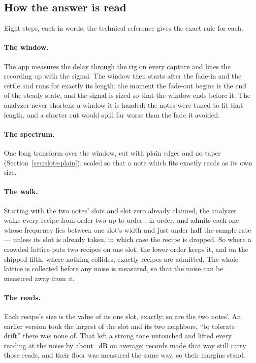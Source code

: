 \documentclass[11pt,a4paper]{article}
\begin{document}
\subsection{How the answer is read}

Eight steps, each in words; the technical reference gives the exact rule
for each.

\paragraph{The window.} The app measures the delay through the rig on
every capture and lines the recording up with the signal. The window then
starts after the fade-in and the settle and runs for exactly its length;
the moment the fade-out begins is the end of the steady state, and the
signal is sized so that the window ends before it. The analyzer never
shortens a window it is handed: the notes were tuned to fit that length,
and a shorter cut would spill far worse than the fade it avoided.

\paragraph{The spectrum.} One long transform over the window, cut with
plain edges and no taper (Section~\ref{sec:slots-plain}), scaled so that
a note which fits exactly reads as its own size.

\paragraph{The walk.} Starting with the two notes' slots and slot zero
already claimed, the analyzer walks every recipe from order two up to
order \imdMaxOrder{}, in order, and admits each one whose frequency lies
between one slot's width and just under half the sample rate --- unless
its slot is already taken, in which case the recipe is dropped. So where
a crowded lattice puts two recipes on one slot, the lower order keeps it,
and on the shipped fifth, where nothing collides, exactly
\imdRecipeCount{} recipes are admitted. The whole lattice is collected
before any noise is measured, so that the noise can be measured away from
it.

\paragraph{The reads.} Each recipe's size is the value of its one slot,
exactly; so are the two notes'. An earlier version took the largest of
the slot and its two neighbors, ``to tolerate drift'' there was none of.
That left a strong tone untouched and lifted every reading at the noise by
about \imdOlderReadBiasDB{}~dB on average; records made that way still
carry those reads, and their floor was measured the same way, so their
margins stand.
\end{document}
